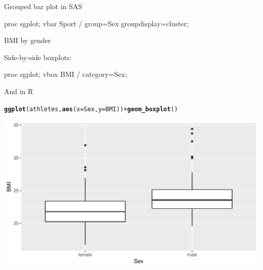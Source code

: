 \documentclass[unknownkeysallowed]{beamer}\usepackage[]{graphicx}\usepackage[]{color}
\makeatletter
\def\maxwidth{ %
  \ifdim\Gin@nat@width>\linewidth
    \linewidth
  \else
    \Gin@nat@width
  \fi
}
\newcommand{\hlopt}[1]{\textcolor[rgb]{0,0,0}{#1}}%
\newcommand{\hlstd}[1]{\textcolor[rgb]{0.345,0.345,0.345}{#1}}%
\newcommand{\hlkwc}[1]{\textcolor[rgb]{0.333,0.667,0.333}{#1}}%
\newcommand{\hlkwd}[1]{\textcolor[rgb]{0.737,0.353,0.396}{\textbf{#1}}}%
\newenvironment{kframe}{%
 \def\at@end@of@kframe{}%
 \ifinner\ifhmode%
  \def\at@end@of@kframe{\end{minipage}}%
  \begin{minipage}{\columnwidth}%
 \fi\fi%
 \def\FrameCommand##1{\hskip\@totalleftmargin \hskip-\fboxsep
 \colorbox{shadecolor}{##1}\hskip-\fboxsep
     \hskip-\linewidth \hskip-\@totalleftmargin \hskip\columnwidth}%
 \MakeFramed {\advance\hsize-\width
   \@totalleftmargin\z@ \linewidth\hsize
   \@setminipage}}%
 {\par\unskip\endMakeFramed%
 \at@end@of@kframe}
\newenvironment{knitrout}{}{} %
\makeatother
\begin{document}
\begin{frame}[fragile]{Grouped bar plot in SAS}
  
  \begin{Sascode}[store=gf]
proc sgplot;
  vbar Sport / group=Sex groupdisplay=cluster;
  \end{Sascode}
  
  
\end{frame}

\begin{frame}[fragile]{BMI by gender}
  
  Side-by-side boxplots:
  
  \begin{Sascode}[store=gg]
proc sgplot;
  vbox BMI / category=Sex;
  \end{Sascode}
  
  
\end{frame}

\begin{frame}[fragile]{And in R}
\begin{knitrout}
\color{fgcolor}\begin{kframe}
\begin{alltt}
\hlkwd{ggplot}\hlstd{(athletes,}\hlkwd{aes}\hlstd{(}\hlkwc{x}\hlstd{=Sex,}\hlkwc{y}\hlstd{=BMI))}\hlopt{+}\hlkwd{geom_boxplot}\hlstd{()}
\end{alltt}
\end{kframe}
\includegraphics[width=\maxwidth]{figure/unnamed-chunk-30-1} 

\end{knitrout}
\end{frame}
\end{document}
